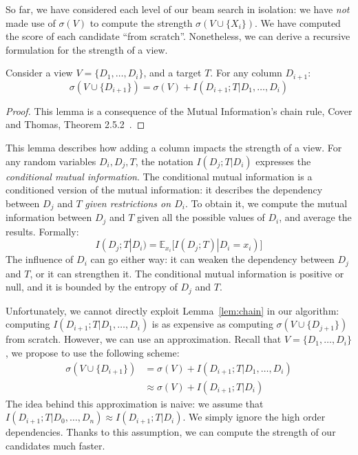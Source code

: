 So far, we have considered each level of our beam search in isolation: we have
\emph{not} made use of $\sigma(V)$ to compute the strength $\sigma(V \cup \{X_i\})$.
We have computed the score of each candidate ``from scratch''. Nonetheless, we
can derive a recursive formulation for the strength of a view. 
\begin{lemma}\label{lem:chain}
Consider a view $V = \{D_1, \ldots, D_i\}$, and a target $T$.
For any column $D_{i+1}$: 
\begin{equation}\label{eq:bonus}
\sigma(V \cup \{D_{i+1}\}) =  \sigma(V) + I(D_{i+1} ; T | D_1 , \ldots, D_i)
\end{equation}
\end{lemma}
\begin{proof}
This lemma is a consequence of the Mutual Information's chain rule,
Cover and Thomas, Theorem 2.5.2~\cite{cover2012elements}.
\end{proof}
This lemma describes how adding a column impacts the strength of a view.  For
any random variables $D_i,D_j,T$, the notation $I(D_j;T|D_i)$  expresses the
\emph{conditional mutual information}. The conditional mutual information is a
conditioned version of the mutual information: it describes the
dependency between $D_j$ and $T$ \emph{given restrictions on $D_i$}. To obtain
it, we compute the mutual information between $D_j$ and $T$ given all the
possible values of $D_i$, and average the results. Formally:
\begin{equation}\label{eq:condmutinfo}
    I(D_j;T|D_i) = \mathbb{E}_{x_i}\big[ I(D_j; T)| D_i = x_i)  \big]
\end{equation}
The influence of $D_i$ can go either way: it can weaken the dependency between
$D_j$ and $T$, or it can strengthen it. The conditional mutual information is
positive or null, and it is bounded by the entropy of $D_j$ and $T$. 

Unfortunately, we cannot directly exploit Lemma~\ref{lem:chain} in our
algorithm: computing $I(D_{i+1} ; T | D_1 , \ldots, D_i)$ is as expensive as
computing $\sigma(V \cup \{D_{j+1}\}) $ from scratch.  However, we can use an
approximation.  Recall that $V = \{D_1, \ldots, D_i\}$, we propose to use the
following scheme:
\begin{equation}\label{eq:approx}
\begin{split}
    \sigma(V \cup \{D_{i+1}\}) & = \sigma(V)   + I(D_{i+1} ; T | D_1, \ldots, D_{i})\\
                               & \approx \sigma(V) + I(D_{i+1} ; T | D_{i})
\end{split}
\end{equation}
The idea behind this approximation is naive: we assume that $I(D_{i+1} ; T |
D_0, \ldots, D_{n}) \approx I(D_{i+1} ; T | D_{i})$. We simply ignore the high
order dependencies. Thanks to this assumption, we can compute the strength of
our candidates much faster. 

